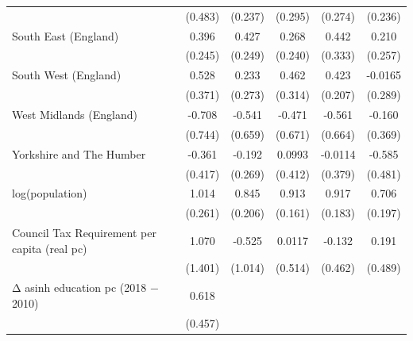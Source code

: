 \begin{table}[htbp]
\begin{tabular}{l*{5}{c}}
                    &     (0.483)         &     (0.237)         &     (0.295)         &     (0.274)         &     (0.236)         \\
\addlinespace
South East (England)&       0.396         &       0.427\sym{*}  &       0.268         &       0.442         &       0.210         \\
                    &     (0.245)         &     (0.249)         &     (0.240)         &     (0.333)         &     (0.257)         \\
\addlinespace
South West (England)&       0.528         &       0.233         &       0.462         &       0.423\sym{**} &     -0.0165         \\
                    &     (0.371)         &     (0.273)         &     (0.314)         &     (0.207)         &     (0.289)         \\
\addlinespace
West Midlands (England)&      -0.708         &      -0.541         &      -0.471         &      -0.561         &      -0.160         \\
                    &     (0.744)         &     (0.659)         &     (0.671)         &     (0.664)         &     (0.369)         \\
\addlinespace
Yorkshire and The Humber&      -0.361         &      -0.192         &      0.0993         &     -0.0114         &      -0.585         \\
                    &     (0.417)         &     (0.269)         &     (0.412)         &     (0.379)         &     (0.481)         \\
\addlinespace
log(population)     &       1.014\sym{***}&       0.845\sym{***}&       0.913\sym{***}&       0.917\sym{***}&       0.706\sym{***}\\
                    &     (0.261)         &     (0.206)         &     (0.161)         &     (0.183)         &     (0.197)         \\
\addlinespace
Council Tax Requirement per capita (real pc)&       1.070         &      -0.525         &      0.0117         &      -0.132         &       0.191         \\
                    &     (1.401)         &     (1.014)         &     (0.514)         &     (0.462)         &     (0.489)         \\
\addlinespace
Δ asinh education pc (2018 − 2010)&       0.618         &                     &                     &                     &                     \\
                    &     (0.457)         &                     &                     &                     &                     \\

\end{tabular}
\end{table}
